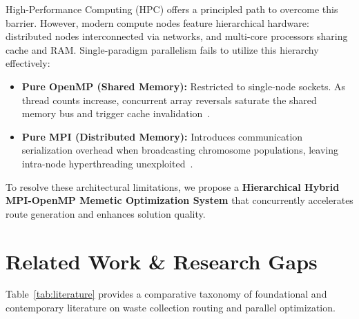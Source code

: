 \documentclass[conference]{IEEEtran}
\begin{document}
High-Performance Computing (HPC) offers a principled path to overcome this barrier. However, modern compute nodes feature hierarchical hardware: distributed nodes interconnected via networks, and multi-core processors sharing cache and RAM. Single-paradigm parallelism fails to utilize this hierarchy effectively:
\begin{itemize}
    \item \textbf{Pure OpenMP (Shared Memory):} Restricted to single-node sockets. As thread counts increase, concurrent array reversals saturate the shared memory bus and trigger cache invalidation~\cite{saxena2020optimized}.
    \item \textbf{Pure MPI (Distributed Memory):} Introduces communication serialization overhead when broadcasting chromosome populations, leaving intra-node hyperthreading unexploited~\cite{alba2013parallel}.
\end{itemize}

To resolve these architectural limitations, we propose a \textbf{Hierarchical Hybrid MPI-OpenMP Memetic Optimization System} that concurrently accelerates route generation and enhances solution quality.

\section{Related Work \& Research Gaps}
Table~\ref{tab:literature} provides a comparative taxonomy of foundational and contemporary literature on waste collection routing and parallel optimization.
\end{document}
